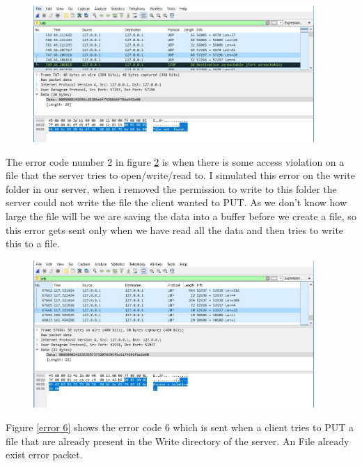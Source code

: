 \documentclass[a4paper,12pt]{article}
\numberwithin{figure}{section}
\begin{document}
\begin{figure}[h!]
	\centering
	\includegraphics[width=0.95\textwidth,keepaspectratio]{img/error1.jpg} 
	\caption{}
	\label{error 1}
\end{figure}

\noindent The error code number 2 in figure \ref{error 2} is when there is some access violation on a file that the server tries to open/write/read to. I simulated this error on the write folder in our server, when i removed the permission to write to this folder the server could not write the file the client wanted to PUT. As we don't know how large the file will be we are saving the data into a buffer before we create a file, so this error gets sent only when we have read all the data and then tries to write this to a file.

\begin{figure}[h!]
	\centering
	\includegraphics[width=0.95\textwidth,keepaspectratio]{img/error2.jpg} 
	\caption{}
	\label{error 2}
\end{figure}

\noindent Figure \ref{error 6} shows the error code 6 which is sent when a client tries to PUT a file that are already present in the Write directory of the server. An File already exist error packet.
 
\end{document}

